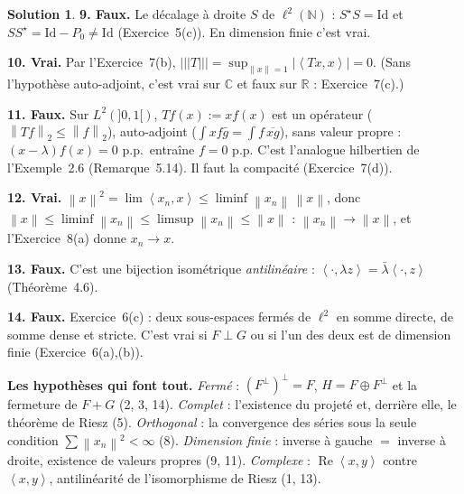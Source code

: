 \documentclass[11pt,a4paper]{article}
\newcommand{\R}{\mathbb{R}}
\newcommand{\N}{\mathbb{N}}
\newcommand{\C}{\mathbb{C}}
\newcommand{\norm}[1]{\left\|#1\right\|}
\newcommand{\opnorm}[1]{|\!|\!|#1|\!|\!|}
\newcommand{\ps}[2]{\left\langle #1,#2\right\rangle}
\renewcommand{\Re}{\operatorname{Re}}
\theoremstyle{definition}
\newtheorem*{solution}{Solution}
\begin{document}
\begin{solution}
\medskip
\noindent\textbf{9. Faux.} Le décalage à droite $S$ de $\ell^2(\N)$ : $S^\star S=\mathrm{Id}$ et $SS^\star=\mathrm{Id}-P_0\ne\mathrm{Id}$ (Exercice~5(c)). En dimension finie c'est vrai.

\medskip
\noindent\textbf{10. Vrai.} Par l'Exercice~7(b), $\opnorm T=\sup_{\norm x=1}|\ps{Tx}x|=0$. (Sans l'hypothèse auto-adjoint, c'est vrai sur $\C$ et faux sur $\R$ : Exercice~7(c).)

\medskip
\noindent\textbf{11. Faux.} Sur $L^2(]0,1[)$, $Tf(x):=xf(x)$ est un opérateur ($\norm{Tf}_2\le\norm f_2$), auto-adjoint ($\int xf\bar g=\int f\,\overline{xg}$), sans valeur propre : $(x-\lambda)f(x)=0$ p.p.\ entraîne $f=0$ p.p. C'est l'analogue hilbertien de l'Exemple~2.6 (Remarque~5.14). Il faut la compacité (Exercice~7(d)).

\medskip
\noindent\textbf{12. Vrai.} $\norm x^2=\lim\ps{x_n}x\le\liminf\norm{x_n}\,\norm x$, donc $\norm x\le\liminf\norm{x_n}\le\limsup\norm{x_n}\le\norm x$ : $\norm{x_n}\to\norm x$, et l'Exercice~8(a) donne $x_n\to x$.

\medskip
\noindent\textbf{13. Faux.} C'est une bijection isométrique \emph{antilinéaire} : $\ps\cdot{\lambda z}=\bar\lambda\ps\cdot z$ (Théorème~4.6).

\medskip
\noindent\textbf{14. Faux.} Exercice~6(c) : deux sous-espaces fermés de $\ell^2$ en somme directe, de somme dense et stricte. C'est vrai si $F\perp G$ ou si l'un des deux est de dimension finie (Exercice~6(a),(b)).
\end{solution}

\begin{piege}
\textbf{Les hypothèses qui font tout.} \emph{Fermé} : $(F^\perp)^\perp=F$, $H=F\oplus F^\perp$ et la fermeture de $F+G$ (2, 3, 14). \emph{Complet} : l'existence du projeté et, derrière elle, le théorème de Riesz (5). \emph{Orthogonal} : la convergence des séries sous la seule condition $\sum\norm{x_n}^2<\infty$ (8). \emph{Dimension finie} : inverse à gauche $=$ inverse à droite, existence de valeurs propres (9, 11). \emph{Complexe} : $\Re\ps xy$ contre $\ps xy$, antilinéarité de l'isomorphisme de Riesz (1, 13).
\end{piege}
\end{document}
